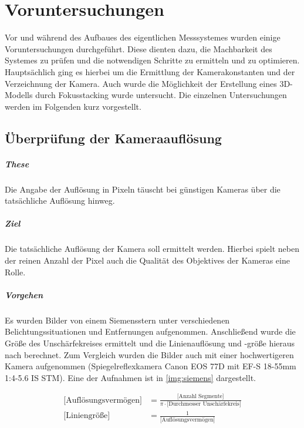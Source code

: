 \documentclass[./00PhotoBox.tex]{subfiles}
\begin{document}
\chapter{Voruntersuchungen}
\label{c:voruntersuchungen}
Vor und während des Aufbaues des eigentlichen Messsystemes wurden einige Voruntersuchungen durchgeführt. Diese dienten dazu, die Machbarkeit des Systemes zu prüfen und die notwendigen Schritte zu ermitteln und zu optimieren. Hauptsächlich ging es hierbei um die Ermittlung der Kamerakonstanten und der Verzeichnung der Kamera. Auch wurde die Möglichkeit der Erstellung eines 3D-Modells durch Fokusstacking wurde untersucht. Die einzelnen Untersuchungen werden im Folgenden kurz vorgestellt.

\section{Überprüfung der Kameraauflösung}

\paragraph{These}
Die Angabe der Auflösung in Pixeln täuscht bei günstigen Kameras über die tatsächliche Auflösung hinweg.

\paragraph{Ziel}
Die tatsächliche Auflösung der Kamera soll ermittelt werden. Hierbei spielt neben der reinen Anzahl der Pixel auch die Qualität des Objektives der Kameras eine Rolle.

\paragraph{Vorgehen}
Es wurden Bilder von einem Siemensstern unter verschiedenen Belichtungssituationen und Entfernungen aufgenommen. Anschließend wurde die Größe des Unschärfekreises ermittelt und die Linienauflösung und -größe hieraus nach \cite[S. 161]{luhmann} berechnet. Zum Vergleich wurden die Bilder auch mit einer hochwertigeren Kamera aufgenommen (Spiegelreflexkamera Canon EOS 77D mit EF-S 18-55mm 1:4-5.6 IS STM). Eine der Aufnahmen ist in \autoref{img:siemens} dargestellt.

\begin{align*}
    \text{[Auflösungsvermögen]} & = \frac{\text{[Anzahl Segmente]}}{\pi \cdot \text{[Durchmesser Unschärfekreis]}} \\
    \text{[Liniengröße]}        & = \frac{1}{\text{[Auflösungsvermögen]}}
\end{align*}
\end{document}
